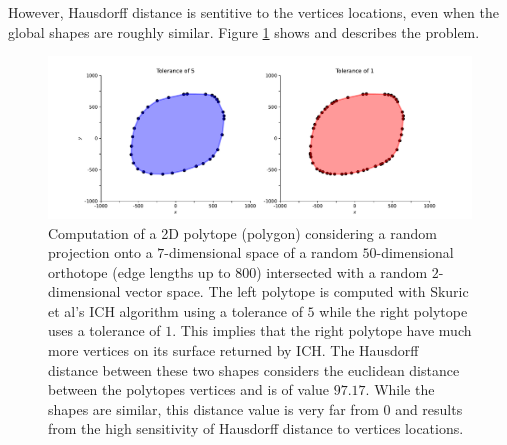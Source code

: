 However, Hausdorff distance is sentitive to the vertices locations, even when the global shapes are roughly similar. Figure \ref{fig:hausdorff_sensitivity} shows and describes the problem.
\begin{figure}[!htb]
    \captionsetup{justification=centering}
        \centering
        \includegraphics[trim={70 20 70 20},clip,width=1\linewidth]{img/chapter_4/chapter_4_hausdorff_sensitivity_1.pdf}
    \caption{Computation of a 2D polytope (polygon) considering a random projection onto a $7$-dimensional space of a random $50$-dimensional orthotope (edge lengths up to 800) intersected with a random $2$-dimensional vector space. The left polytope is computed with Skuric et al's ICH algorithm using a tolerance of $5$ while the right polytope uses a tolerance of $1$. This implies that the right polytope have much more vertices on its surface returned by ICH. The Hausdorff distance between these two shapes considers the euclidean distance between the polytopes vertices and is of value $97.17$. While the shapes are similar, this distance value is very far from $0$ and results from the high sensitivity of Hausdorff distance to vertices locations.}
    \label{fig:hausdorff_sensitivity}
\end{figure}

